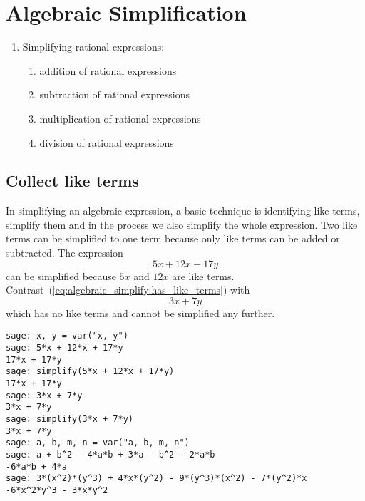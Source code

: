 
\chapter{Algebraic Simplification}

\begin{enumerate}
\item Simplifying rational expressions:
  \begin{enumerate}
  \item addition of rational expressions

  \item subtraction of rational expressions

  \item multiplication of rational expressions

  \item division of rational expressions
  \end{enumerate}
\end{enumerate}



\section{Collect like terms}

In simplifying an algebraic expression, a basic technique is
identifying like terms, simplify them and in the
process we also simplify the whole expression. Two like terms can be
simplified to one term because only like terms can be added or
subtracted. The expression
%
\begin{equation}
\label{eq:algebraic_simplify:has_like_terms}
5x + 12x + 17y
\end{equation}
%
can be simplified because $5x$ and $12x$ are like
terms. Contrast~(\ref{eq:algebraic_simplify:has_like_terms}) with
\[
3x + 7y
\]
which has no like terms and cannot be simplified any further.

\begin{lstlisting}
sage: x, y = var("x, y")
sage: 5*x + 12*x + 17*y
17*x + 17*y
sage: simplify(5*x + 12*x + 17*y)
17*x + 17*y
sage: 3*x + 7*y
3*x + 7*y
sage: simplify(3*x + 7*y)
3*x + 7*y
sage: a, b, m, n = var("a, b, m, n")
sage: a + b^2 - 4*a*b + 3*a - b^2 - 2*a*b
-6*a*b + 4*a
sage: 3*(x^2)*(y^3) + 4*x*(y^2) - 9*(y^3)*(x^2) - 7*(y^2)*x
-6*x^2*y^3 - 3*x*y^2
\end{lstlisting}


